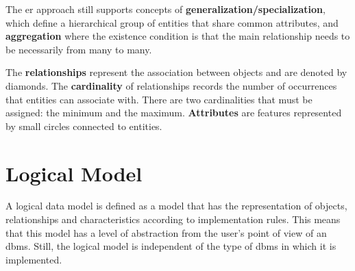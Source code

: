 The \ac{er} approach still supports concepts of \textbf{generalization/specialization}, which define a hierarchical group of entities that share common attributes, and \textbf{aggregation} where the existence condition is that the main relationship needs to be necessarily from many to many.

The \textbf{relationships} represent the association between objects and are denoted by diamonds.
The \textbf{cardinality} of relationships records the number of occurrences that entities can associate with.
There are two cardinalities that must be assigned: the minimum and the maximum. \textbf{Attributes} are features represented by small circles connected to entities.

\section{Logical Model}
\label{sec_back:logicalModel}

A logical data model is defined as a model that has the representation of objects, relationships and characteristics according to implementation rules.
This means that this model has a level of abstraction from the user's point of view of an \ac{dbms}.
Still, the logical model is independent of the type of \ac{dbms} in which it is implemented.

